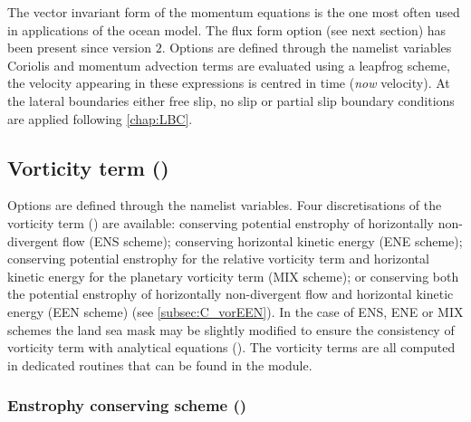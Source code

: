\documentclass[../main/NEMO_manual]{subfiles}
\begin{document}
The vector invariant form of the momentum equations is the one most often used in
applications of the \NEMO ocean model.
The flux form option (see next section) has been present since version $2$.
Options are defined through the  namelist variables Coriolis and
momentum advection terms are evaluated using a leapfrog scheme,
\ie the velocity appearing in these expressions is centred in time (\textit{now} velocity). 
At the lateral boundaries either free slip, no slip or partial slip boundary conditions are applied following
\autoref{chap:LBC}.

\subsection{Vorticity term (\protect{})}
\label{subsec:DYN_vor}


Options are defined through the  namelist variables.
Four discretisations of the vorticity term () are available:
conserving potential enstrophy of horizontally non-divergent flow (ENS scheme);
conserving horizontal kinetic energy (ENE scheme);
conserving potential enstrophy for the relative vorticity term and
horizontal kinetic energy for the planetary vorticity term (MIX scheme);
or conserving both the potential enstrophy of horizontally non-divergent flow and horizontal kinetic energy
(EEN scheme) (see \autoref{subsec:C_vorEEN}).
In the case of ENS, ENE or MIX schemes the land sea mask may be slightly modified to ensure the consistency of
vorticity term with analytical equations ().
The vorticity terms are all computed in dedicated routines that can be found in the  module.

\subsubsection{Enstrophy conserving scheme (\protect{})}
\label{subsec:DYN_vor_ens}
\end{document}
